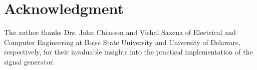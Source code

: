 \vspace{-1em}
\section{Acknowledgment}
\vspace{-1em}

The author thanks Drs. John Chiasson and Vishal Saxena of Electrical and
Computer Engineering at Boise State University and University of Delaware,
respectively, for their invaluable insights into the practical implementation of
the signal generator.
